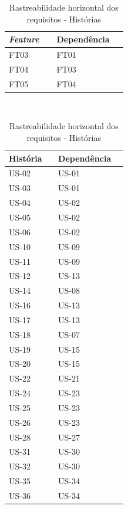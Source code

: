 \begin{table}[!h]
\centering
\label{horizontal}
\caption{Rastreabilidade horizontal dos requisitos - \textit{Features}}
\begin{tabular}{p{0.20\linewidth}|p{0.20\linewidth}}
  \hline
  \textbf{\textit{Feature}}  & \textbf{Dependência} \\
  \hline
      FT03& FT01\\\hline
      FT04& FT03 \\\hline
      FT05& FT04 \\\hline
  \end{tabular}
\\
\label{horizontal2}
\caption{Rastreabilidade horizontal dos requisitos - Histórias}
\begin{tabular}{p{0.20\linewidth}|p{0.20\linewidth}}
  \hline
  \textbf{História}  & \textbf{Dependência}\\
  \hline
      US-02 & US-01\\ \hline
      US-03 & US-01\\ \hline
      US-04 & US-02\\\hline
      US-05 & US-02\\\hline
      US-06 & US-02\\\hline
      US-10 & US-09\\\hline
      US-11 & US-09\\\hline
      US-12 & US-13\\\hline
      US-14 & US-08\\\hline
      US-16 & US-13\\\hline
      US-17 & US-13\\\hline
      US-18 & US-07\\\hline
      US-19 & US-15\\\hline
      US-20 & US-15\\\hline
      US-22 & US-21\\\hline
      US-24 & US-23\\\hline
      US-25 & US-23\\\hline
      US-26 & US-23\\\hline
      US-28 & US-27\\\hline
      US-31 & US-30\\\hline
      US-32 & US-30\\\hline
      US-35 & US-34\\\hline
      US-36 & US-34\\ \hline
  \end{tabular}
\end{table}



